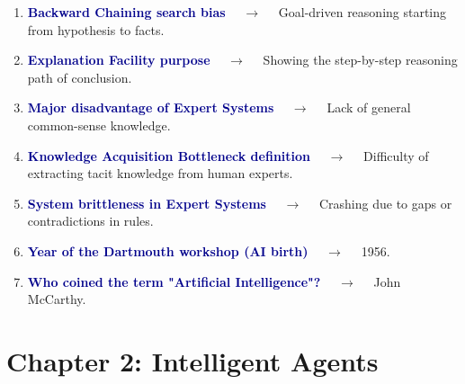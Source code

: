\documentclass[11pt,a4paper]{article}
\begin{document}
\begin{enumerate}[label=\arabic*., leftmargin=*, labelsep=0.8em, itemsep=0.35em, parsep=0.1em, topsep=0.2em]
  \item \textcolor{darkblue}{\textbf{Backward Chaining search bias}} $\quad\to\quad$ Goal-driven reasoning starting from hypothesis to facts.
  \item \textcolor{darkblue}{\textbf{Explanation Facility purpose}} $\quad\to\quad$ Showing the step-by-step reasoning path of conclusion.
  \item \textcolor{darkblue}{\textbf{Major disadvantage of Expert Systems}} $\quad\to\quad$ Lack of general common-sense knowledge.
  \item \textcolor{darkblue}{\textbf{Knowledge Acquisition Bottleneck definition}} $\quad\to\quad$ Difficulty of extracting tacit knowledge from human experts.
  \item \textcolor{darkblue}{\textbf{System brittleness in Expert Systems}} $\quad\to\quad$ Crashing due to gaps or contradictions in rules.
  \item \textcolor{darkblue}{\textbf{Year of the Dartmouth workshop (AI birth)}} $\quad\to\quad$ 1956.
  \item \textcolor{darkblue}{\textbf{Who coined the term "Artificial Intelligence"?}} $\quad\to\quad$ John McCarthy.
\end{enumerate}

\section*{Chapter 2: Intelligent Agents}
\end{document}
